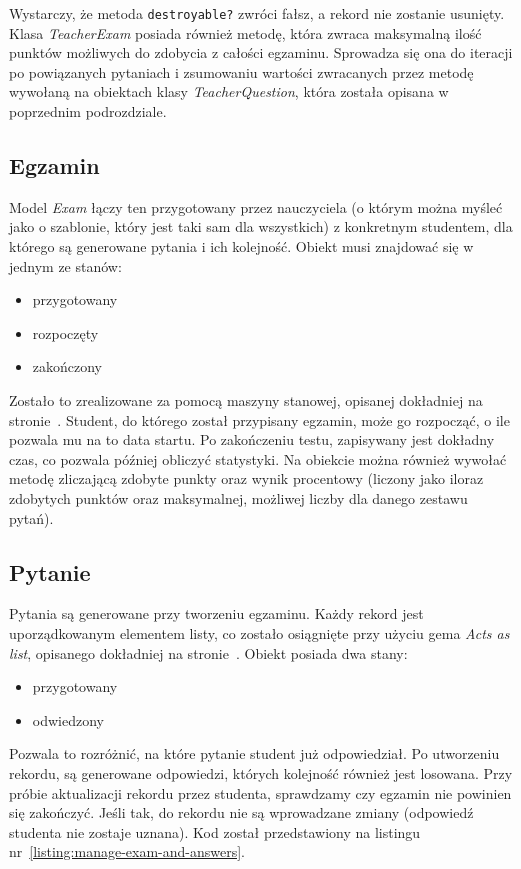 \documentclass[12pt,twoside]{report}
\begin{document}
Wystarczy, że metoda \texttt{destroyable?} zwróci fałsz, a rekord nie zostanie usunięty.
Klasa \emph{TeacherExam} posiada również metodę, która zwraca maksymalną ilość punktów
możliwych do zdobycia z całości egzaminu. Sprowadza się ona do iteracji po powiązanych
pytaniach i zsumowaniu wartości zwracanych przez metodę wywołaną na obiektach
klasy \emph{TeacherQuestion}, która została opisana w poprzednim podrozdziale.

\subsection{Egzamin}
Model \emph{Exam} łączy ten przygotowany przez nauczyciela (o którym można myśleć jako
o szablonie, który jest taki sam dla wszystkich) z konkretnym studentem, dla którego są
generowane pytania i ich kolejność. Obiekt musi znajdować się w jednym ze stanów:

\begin{itemize}
  \item{przygotowany}
  \item{rozpoczęty}
  \item{zakończony}
\end{itemize}


Zostało to zrealizowane za pomocą maszyny stanowej, opisanej dokładniej na
stronie~\pageref{sec:state_machine}. Student, do którego został przypisany egzamin, może
go rozpocząć, o ile pozwala mu na to data startu. Po zakończeniu testu, zapisywany jest
dokładny czas, co pozwala później obliczyć statystyki. Na obiekcie można również wywołać
metodę zliczającą zdobyte punkty oraz wynik procentowy (liczony jako iloraz zdobytych
punktów oraz maksymalnej, możliwej liczby dla danego zestawu pytań).

\subsection{Pytanie}
Pytania są generowane przy tworzeniu egzaminu. Każdy rekord jest uporządkowanym elementem
listy, co zostało osiągnięte przy użyciu gema \emph{Acts as list}, opisanego dokładniej na
stronie~\pageref{sec:acts_as_list}. Obiekt posiada dwa stany:

\begin{itemize}
  \item{przygotowany}
  \item{odwiedzony}
\end{itemize}


Pozwala to rozróżnić, na które pytanie student już odpowiedział. Po utworzeniu rekordu, są
generowane odpowiedzi, których kolejność również jest losowana. Przy próbie aktualizacji
rekordu przez studenta, sprawdzamy czy egzamin nie powinien się zakończyć. Jeśli tak,
do rekordu nie są wprowadzane zmiany (odpowiedź studenta nie zostaje uznana). Kod został
przedstawiony na listingu nr~\ref{listing:manage-exam-and-answers}.
\end{document}
